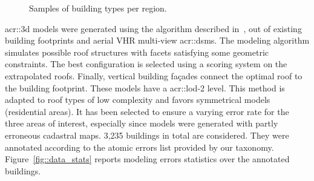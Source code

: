 \begin{figure}[htpb]
{\begin{subfloatrow}[3]
                \end{subfloatrow}
            }{
                \label{fig::france_map}
                \caption{
                    Samples of building types per region.
                }
            }
        \end{figure}

        \gls{acr::3d} models were generated using the algorithm described in~\parencite{durupt2006automatic}, out of existing building footprints and aerial VHR multi-view \glspl{acr::dsm}.
        The modeling algorithm simulates possible roof structures with facets satisfying some geometric constraints.
        The best configuration is selected using a scoring system on the extrapolated roofs.
        Finally, vertical building fa\c{c}ades connect the optimal roof to the building footprint.
        These models have a \gls{acr::lod}-2 level.
        This method is adapted to roof types of low complexity and favors symmetrical models (residential areas).
        It has been selected to ensure a varying error rate for the three areas of interest, especially since models were generated with partly erroneous cadastral maps.
        3,235 buildings in total are considered.
        They were annotated according to the atomic errors list provided by our taxonomy.
        Figure~\ref{fig::data_stats} reports modeling errors statistics over the annotated buildings.

